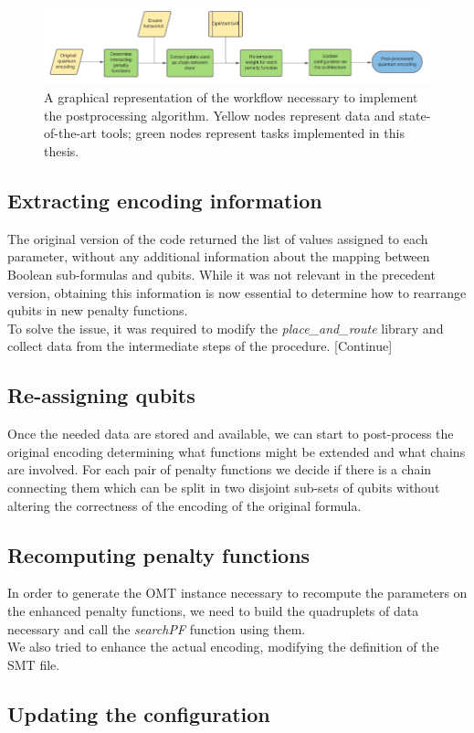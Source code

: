 \begin{figure}[t]
	\begin{center}
	\includegraphics[width=\textwidth]{images/Workflow.png}
	\caption{A graphical representation of the workflow necessary to implement the postprocessing algorithm. Yellow nodes represent data and state-of-the-art tools; green nodes represent tasks implemented in this thesis.}
	\end{center}
\end{figure}

\subsection{Extracting encoding information}

The original version of the code returned the list of values assigned to each parameter, without any additional information about the mapping between Boolean sub-formulas and qubits. While it was not relevant in the precedent version, obtaining this information is now essential to determine how to rearrange qubits in new penalty functions. \\
To solve the issue, it was required to modify the \textit{place\_and\_route} library and collect data from the intermediate steps of the procedure. [Continue]

\subsection{Re-assigning qubits}

Once the needed data are stored and available, we can start to post-process the original encoding determining what functions might be extended and what chains are involved. For each pair of penalty functions we decide if there is a chain connecting them which can be split in two disjoint sub-sets of qubits without altering the correctness of the encoding of the original formula.

\subsection{Recomputing penalty functions}

In order to generate the OMT instance necessary to recompute the parameters on the enhanced penalty functions, we need to build the quadruplets of data necessary and call the \textit{searchPF} function using them.\\
We also tried to enhance the actual encoding, modifying the definition of the SMT file. 

\subsection{Updating the configuration}

\newpage

